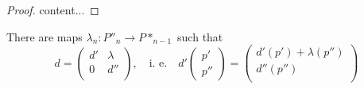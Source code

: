 \begin{proof}
	content...
\end{proof}

\begin{exercise}
	There are maps $\lambda_n: P''_n\rightarrow P*_{n-1}$ such that
	$$d=\begin{pmatrix}
			d' & \lambda \\
			0 & d'' \\
	\end{pmatrix},
	\quad\text{i. e.}\quad
	d'\begin{pmatrix}p'\\p''\end{pmatrix}=
		\begin{pmatrix}
			d'(p')+\lambda(p'') \\
			d''(p'')\\
		\end{pmatrix}$$
\end{exercise}